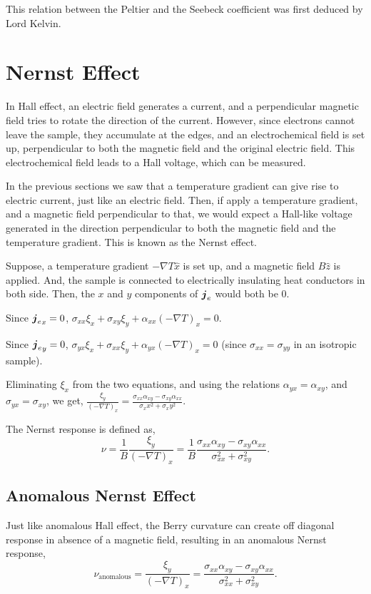 \documentclass{report}
\renewcommand\vec[1]{\ensuremath\boldsymbol{#1}} %
\begin{document}
This relation between the Peltier and the Seebeck coefficient was first deduced by Lord Kelvin.
\section{Nernst Effect}
In Hall effect, an electric field generates a current, and a perpendicular magnetic field tries to rotate the direction of the current. However, since electrons cannot leave the sample, they accumulate at the edges, and an electrochemical field is set up, perpendicular to both the magnetic field and the original electric field. This electrochemical field leads to a Hall voltage, which can be measured.

In the previous sections we saw that a temperature gradient can give rise to electric current, just like an electric field. Then, if apply a temperature gradient, and a magnetic field perpendicular to that, we would expect a Hall-like voltage generated in the direction perpendicular to both the magnetic field and the temperature gradient. This is known as the Nernst effect.

Suppose, a temperature gradient $-\nabla T \hat{x}$ is set up, and a magnetic field $B \hat{z}$ is applied. And, the sample is connected to electrically insulating heat conductors in both side. Then, the $x$ and $y$ components of $\vec{j}_e$ would both be $0$.

Since ${\vec{j}_e}_x = 0$, $\sigma_{xx} \xi_x + \sigma_{xy} \xi_y + \alpha_{xx} (-\nabla T)_x = 0$. 

Since ${\vec{j}_e}_y = 0$, $\sigma_{yx} \xi_x + \sigma_{xx} \xi_y + \alpha_{y x} (-\nabla T)_x = 0$ (since $\sigma_{xx} = \sigma_{yy}$ in an isotropic sample).

Eliminating $\xi_x$ from the two equations, and using the relations $\alpha_{y x} = \alpha_{x y}$, and $\sigma_{y x} = \sigma_{x y}$, we get, $\frac{\xi_y}{(-\nabla T)_x} = \frac{\sigma_{xx} \alpha_{xy} - \sigma_{xy} \alpha_{xx}}{\sigma_xx ^2 + \sigma_xy ^2}$.

The Nernst response is defined \cite{Ussishkin_2002} as,
$$\nu = \frac{1}{B} \frac{\xi_y}{(-\nabla T)_x} = \frac{1}{B} \frac{\sigma_{xx} \alpha_{xy} - \sigma_{xy} \alpha_{xx}}{\sigma_{xx} ^2 + \sigma_{xy} ^2}.$$



\subsection{Anomalous Nernst Effect}
Just like anomalous Hall effect, the Berry curvature can create off diagonal response in absence of a magnetic field, resulting in an anomalous Nernst response,
$$\nu_\text{anomalous} = \frac{\xi_y}{(-\nabla T)_x} = \frac{\sigma_{xx} \alpha_{xy} - \sigma_{xy} \alpha_{xx}}{\sigma_{xx} ^2 + \sigma_{xy} ^2}.$$
\end{document}
